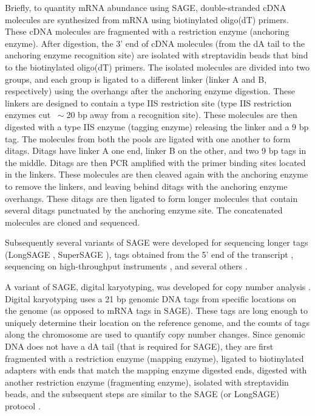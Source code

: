 Briefly, to quantity mRNA abundance using SAGE, double-stranded cDNA
molecules are synthesized from mRNA using biotinylated oligo(dT) primers.
These cDNA molecules are fragmented with a restriction enzyme (anchoring
enzyme).
%
After digestion, the 3' end of cDNA molecules (from the dA tail to the
anchoring enzyme recognition site) are isolated with streptavidin beads
that bind to the biotinylated oligo(dT) primers.
%
The isolated molecules are divided into two groups, and each group is
ligated to a different linker (linker A and B, respectively) using the
overhangs after the anchoring enzyme digestion. These linkers are
designed to contain a type IIS restriction site (type IIS restriction
enzymes cut $~\sim$20 bp away from a recognition site).
%
These molecules are then digested with a type IIS enzyme (tagging
enzyme) releasing the linker and a 9 bp tag.
%
The molecules from both the pools are ligated with one another to form
ditags. Ditags have linker A one end, linker B on the other, and two 9
bp tags in the middle.
%
Ditags are then PCR amplified with the primer binding sites located in
the linkers.
%
These molecules are then cleaved again with the anchoring enzyme to
remove the linkers, and leaving behind ditags with the anchoring enzyme
overhangs.  These ditags are then ligated to form longer molecules
that contain several ditags punctuated by the anchoring enzyme site.
%
The concatenated molecules are cloned and sequenced.


Subsequently several variants of SAGE were developed for sequencing longer
tags (LongSAGE \citep{saha2002using,hu2006serial}, SuperSAGE
\citep{matsumura2003gene}), tags obtained from the 5'
end of the transcript \citep{wei20045}, sequencing on high-throughput
instruments \citep{matsumura2010high},  and several others
\citep{zawada2014massive,peters1999comprehensive}.


A variant of SAGE, digital karyotyping, was developed for copy number
analysis \citep{wang2002digital,leary2007digital}. Digital karyotyping
uses a 21 bp genomic DNA tags from specific locations on the genome (as
opposed to mRNA tags in SAGE).  These tags are long enough to uniquely
determine their location on the reference genome, and the counts of
tags along the chromosome are used to quantify copy number changes.
%
Since genomic DNA does not have a dA tail (that is required for SAGE),
they are first fragmented with a restriction enzyme (mapping enzyme),
ligated to biotinylated adapters with ends that match the mapping
enzyme digested ends, digested with another restriction enzyme
(fragmenting enzyme), isolated with streptavidin beads, and the
subsequent steps are similar to the SAGE (or LongSAGE) protocol
\citep{wang2002digital,leary2007digital}.

